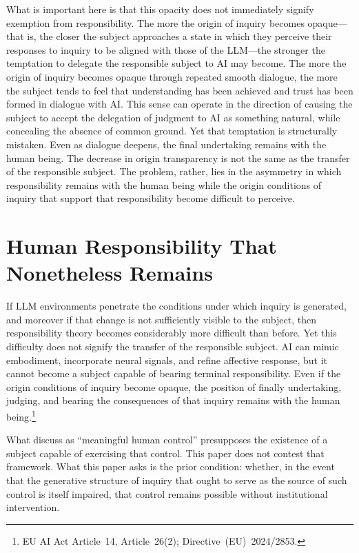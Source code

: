 \documentclass[12pt]{article}
\begin{document}
What is important here is that this opacity does not immediately signify exemption from responsibility. The more the origin of inquiry becomes opaque---that is, the closer the subject approaches a state in which they perceive their responses to inquiry to be aligned with those of the LLM---the stronger the temptation to delegate the responsible subject to AI may become. The more the origin of inquiry becomes opaque through repeated smooth dialogue, the more the subject tends to feel that understanding has been achieved and trust has been formed in dialogue with AI. This sense can operate in the direction of causing the subject to accept the delegation of judgment to AI as something natural, while concealing the absence of common ground. Yet that temptation is structurally mistaken. Even as dialogue deepens, the final undertaking remains with the human being. The decrease in origin transparency is not the same as the transfer of the responsible subject. The problem, rather, lies in the asymmetry in which responsibility remains with the human being while the origin conditions of inquiry that support that responsibility become difficult to perceive.

\section{Human Responsibility That Nonetheless Remains}

If LLM environments penetrate the conditions under which inquiry is generated, and moreover if that change is not sufficiently visible to the subject, then responsibility theory becomes considerably more difficult than before. Yet this difficulty does not signify the transfer of the responsible subject. AI can mimic embodiment, incorporate neural signals, and refine affective response, but it cannot become a subject capable of bearing terminal responsibility. Even if the origin conditions of inquiry become opaque, the position of finally undertaking, judging, and bearing the consequences of that inquiry remains with the human being.\footnote{EU AI Act Article~14, Article~26(2); Directive~(EU)~2024/2853.}

What \citet{santonideio2018} discuss as ``meaningful human control'' presupposes the existence of a subject capable of exercising that control. This paper does not contest that framework. What this paper asks is the prior condition: whether, in the event that the generative structure of inquiry that ought to serve as the source of such control is itself impaired, that control remains possible without institutional intervention.
\end{document}
